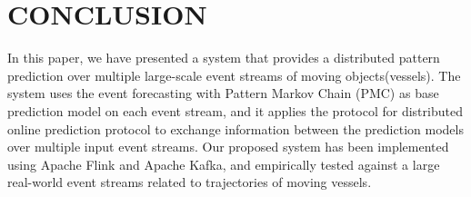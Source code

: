 
\section{CONCLUSION}
\label{sec:concl}
In this paper, we have presented a system that provides  a distributed pattern prediction over multiple large-scale event streams of moving objects(vessels). The system uses the event forecasting with Pattern Markov Chain (PMC) \cite{alevizos2017event} as base prediction model on each event stream, and it applies the protocol for distributed online prediction \cite{kamp2014communication} protocol to exchange information between the prediction models over multiple input event streams.  Our proposed system has been implemented using Apache Flink and Apache Kafka, and empirically tested against a large real-world event streams related to trajectories of moving vessels.